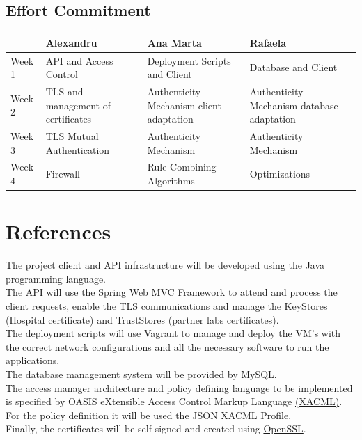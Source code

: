 \subsection{Effort Commitment}

\begin{tabularx}{0.8\textwidth} { 
  | >{\centering\arraybackslash}X 
  | >{\centering\arraybackslash}X 
  | >{\centering\arraybackslash}X 
  | >{\centering\arraybackslash}X | }
 \hline
  & Alexandru & Ana Marta & Rafaela \\
 \hline
 Week 1  & API and Access Control  & Deployment Scripts and Client  & Database and Client \\
  \hline
  Week 2  & TLS and management of certificates  & Authenticity Mechanism client adaptation  & Authenticity Mechanism database adaptation \\
   \hline
   Week 3  & TLS Mutual Authentication  & Authenticity Mechanism  & Authenticity Mechanism \\
    \hline
    Week 4  & Firewall  & Rule Combining Algorithms  & Optimizations \\
\hline
\end{tabularx}

\section{References}

The project client and API infrastructure will be developed using the Java programming language. \\

The API will use the \href{https://docs.spring.io/spring-framework/docs/3.2.x/spring-framework-reference/html/mvc.html}{Spring Web MVC} Framework to attend and process the client requests, enable the TLS communications and manage the KeyStores (Hospital certificate) and TrustStores (partner labs certificates). \\

The deployment scripts will use \href{https://www.vagrantup.com/}{Vagrant} to manage and deploy the VM's with the correct network configurations and all the necessary software to run the applications. \\

The database management system will be provided by \href{https://www.mysql.com/}{MySQL}. \\

The access manager architecture and policy defining language to be implemented is specified by OASIS eXtensible Access Control Markup Language \href{https://www.oasis-open.org/committees/tc_home.php?wg_abbrev=xacml#other}{(XACML)}. For the policy definition it will be used the JSON XACML Profile. \\

Finally, the certificates will be self-signed and created using \href{https://www.openssl.org/}{OpenSSL}. \\
